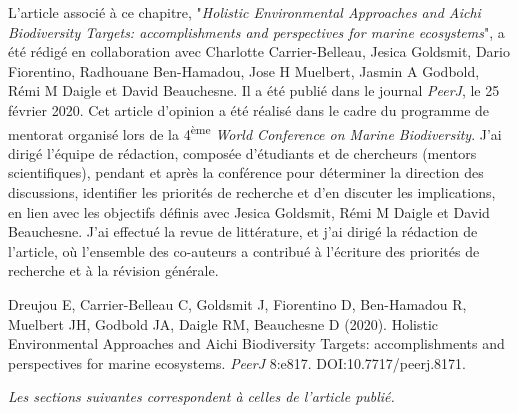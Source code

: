 L'article associé à ce chapitre, "\textit{Holistic Environmental Approaches and Aichi Biodiversity Targets: accomplishments and perspectives for marine ecosystems}", a été rédigé en collaboration avec Charlotte Carrier-Belleau, Jesica Goldsmit, Dario Fiorentino, Radhouane Ben-Hamadou, Jose H Muelbert, Jasmin A Godbold, Rémi M Daigle et David Beauchesne. Il a été publié dans le journal \textit{PeerJ}, le 25 février 2020. Cet article d'opinion a été réalisé dans le cadre du programme de mentorat organisé lors de la 4\textsuperscript{ème} \textit{World Conference on Marine Biodiversity}. J'ai dirigé l'équipe de rédaction, composée d'étudiants et de chercheurs (mentors scientifiques), pendant et après la conférence pour déterminer la direction des discussions, identifier les priorités de recherche et d'en discuter les implications, en lien avec les objectifs définis avec Jesica Goldsmit, Rémi M Daigle et David Beauchesne. J'ai effectué la revue de littérature, et j'ai dirigé la rédaction de l'article, où l'ensemble des co-auteurs a contribué à l'écriture des priorités de recherche et à la révision générale. \linebreak[4]

\begin{singlespace}
Dreujou E, Carrier-Belleau C, Goldsmit J, Fiorentino D, Ben-Hamadou R, Muelbert JH, Godbold JA, Daigle RM, Beauchesne D (2020). Holistic Environmental Approaches and Aichi Biodiversity Targets: accomplishments and perspectives for marine ecosystems. \textit{PeerJ} 8:e817. DOI:10.7717/peerj.8171.
\end{singlespace}

\textit{Les sections suivantes correspondent à celles de l'article publié.}

